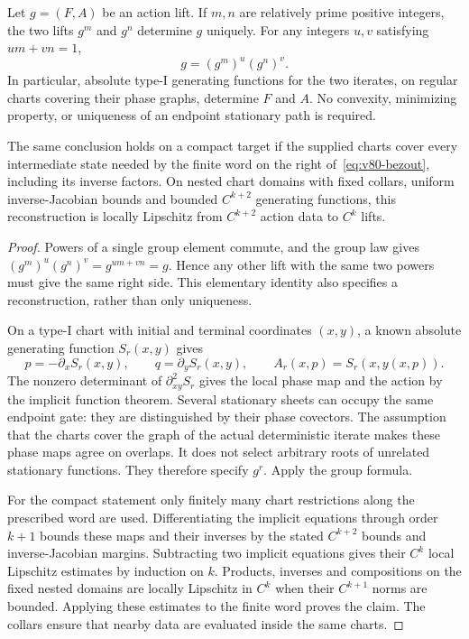 \begin{theorem}
\label{thm:v80-coprime}
Let $g=(F,A)$ be an action lift.  If $m,n$ are relatively prime positive
integers, the two lifts $g^m$ and $g^n$ determine $g$ uniquely.  For any
integers $u,v$ satisfying $um+vn=1$,
\begin{equation}\label{eq:v80-bezout}
                         g=(g^m)^u(g^n)^v.
\end{equation}
In particular, absolute type-I generating functions for the two
iterates, on regular charts covering their phase graphs, determine $F$
and $A$.  No convexity, minimizing property, or uniqueness of an
endpoint stationary path is required.

The same conclusion holds on a compact target if the supplied charts
cover every intermediate state needed by the finite word on the
right of~\eqref{eq:v80-bezout}, including its inverse factors.
On nested chart domains with fixed collars, uniform inverse-Jacobian
bounds and bounded $C^{k+2}$ generating functions, this reconstruction
is locally Lipschitz from $C^{k+2}$ action data to $C^k$ lifts.
\end{theorem}
\begin{proof}
Powers of a single group element commute, and the group law gives
$(g^m)^u(g^n)^v=g^{um+vn}=g$.  Hence any other lift with the same two
powers must give the same right side.  This elementary identity also
specifies a reconstruction, rather than only uniqueness.

On a type-I chart with initial and terminal coordinates $(x,y)$, a
known absolute generating function $S_r(x,y)$ gives
\[
       p=-\partial_x S_r(x,y),\qquad
       q=\partial_y S_r(x,y),\qquad
       A_r(x,p)=S_r(x,y(x,p)).
\]
The nonzero determinant of $\partial_{xy}^2S_r$ gives the local phase
map and the action by the implicit function theorem.  Several stationary
sheets can occupy the same endpoint gate: they are distinguished by
their phase covectors.  The assumption that the charts cover the graph
of the actual deterministic iterate makes these phase maps agree on
overlaps.  It does not select arbitrary roots of unrelated stationary
functions.  They therefore specify $g^r$.  Apply the group formula.

For the compact statement only finitely many chart restrictions along
the prescribed word are used.  Differentiating the implicit equations
through order $k+1$ bounds these maps and their inverses by the stated
$C^{k+2}$ bounds and inverse-Jacobian margins.  Subtracting two implicit
equations gives their $C^k$ local Lipschitz estimates by induction on
$k$.  Products, inverses and compositions on the fixed nested domains
are locally Lipschitz in $C^k$ when their $C^{k+1}$ norms are bounded.
Applying these estimates to the finite word proves the claim.  The
collars ensure that nearby data are evaluated inside the same charts.
\end{proof}


